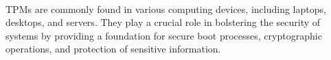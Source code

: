 \paragraph*{}
TPMs are commonly found in various computing devices, including laptops, desktops, and servers. They play a crucial role in bolstering the security of systems by providing a foundation for secure boot processes, cryptographic operations, and protection of sensitive information.





%
%
%
%
%
%
%
%
%
%
